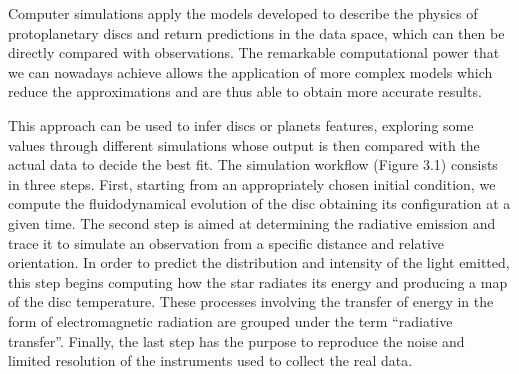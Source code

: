 \documentclass[a4paper,10pt]{report}
\begin{document}
Computer simulations apply the models developed to describe the physics of protoplanetary discs 
and return predictions in the data space, which can then be directly compared with observations.
The remarkable computational power that we can nowadays achieve allows the application of
more complex models which reduce the approximations and are thus able to obtain more 
accurate results.

This approach can be used to infer discs or planets features, exploring some values through different simulations
whose output is then compared with the actual data to decide the best fit.
The simulation workflow (Figure 3.1) consists in three steps. 
First, starting from an appropriately chosen initial condition,
we compute the fluidodynamical evolution of the disc obtaining its configuration
at a given time. The second step is aimed at determining the radiative emission and trace it 
to simulate an observation from a specific distance and relative orientation.
In order to predict the distribution and intensity of the light emitted, this step begins computing
how the star radiates its energy and producing a map of the disc temperature. These processes involving the
transfer of energy in the form of electromagnetic radiation are grouped under the term ``radiative transfer''.
Finally, the last step has the purpose to reproduce the noise and limited resolution of the instruments 
used to collect the real data.
\end{document}

